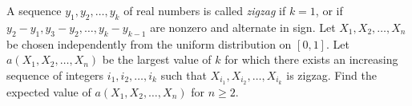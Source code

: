 \documentclass{article}
\begin{document}
A sequence $y_1,y_2,\dots,y_k$ of real numbers is called \textit{zigzag} if $k=1$, or if $y_2-y_1, y_3-y_2, \dots, y_k-y_{k-1}$ are nonzero and alternate in sign. Let $X_1,X_2,\dots,X_n$ be chosen independently from the uniform distribution on $[0,1]$. Let $a(X_1,X_2,\dots,X_n)$ be the largest value of $k$ for which there exists an increasing sequence of integers $i_1,i_2,\dots,i_k$ such that $X_{i_1},X_{i_2},\dots,X_{i_k}$ is zigzag. Find the expected value of $a(X_1,X_2,\dots,X_n)$ for $n \geq 2$.
\end{document}
